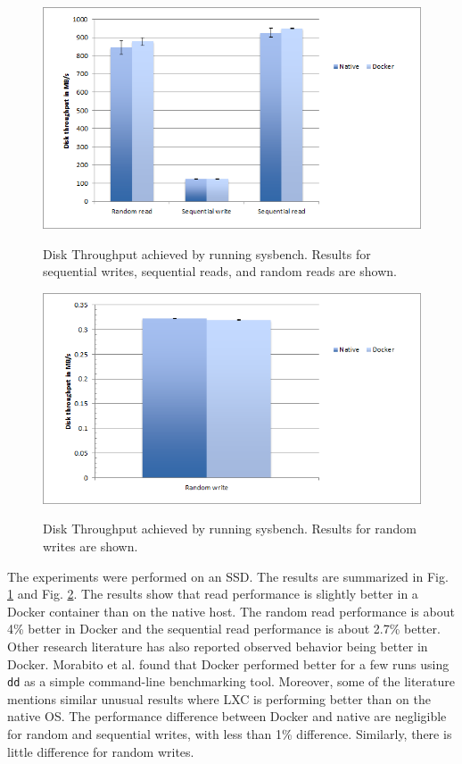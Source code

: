 \documentclass[11pt]{article}
\begin{document}
\begin{figure}
	\centering
	{\includegraphics[width=150mm]{disk1}}
	\caption{ Disk Throughput achieved by running sysbench.
		Results for sequential writes, sequential reads, and random reads are shown.
		 }
	\label{fig:disk1}
\end{figure}

\begin{figure}
	\centering
	{\includegraphics[width=150mm]{disk2}}
	\caption{ Disk Throughput achieved by running sysbench.
		Results for random writes are shown.
	}
	\label{fig:disk2}
\end{figure}

The experiments were performed on an SSD. The results are summarized in Fig. \ref{fig:disk1} and Fig. \ref{fig:disk2}. The results show that read performance is slightly better in a Docker container than on the native host. The random read performance is about 4\% better in Docker and the sequential read performance is about 2.7\% better. Other research literature has also reported observed behavior being better in Docker. Morabito et al. found that Docker performed better for a few runs using \texttt{dd} as a simple command-line benchmarking tool. Moreover, some of the literature \cite{estrada} mentions similar unusual results where LXC is performing better than on the native OS. The performance difference between Docker and native are negligible for random and sequential writes, with less than 1\% difference. Similarly, there is little difference for random writes. 
\end{document}
